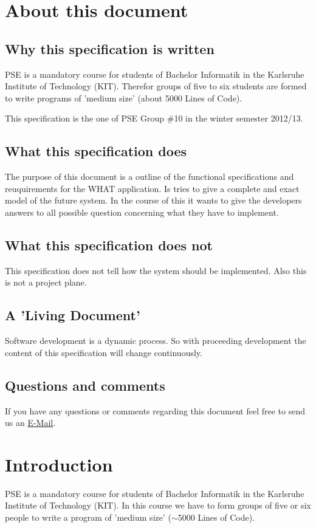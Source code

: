 \section*{About this document}

\subsection*{Why this specification is written}
PSE is a mandatory course for students of Bachelor Informatik in the %
Karlsruhe Institute of Technology (KIT). Therefor groups of five to six
students are formed to write programs of 'medium size' (about 5000 Lines of Code).

This specification is the one of PSE Group \#10 in the winter semester 2012/13.


\subsection*{What this specification does}
The purpose of this document is a outline of the functional specifications and reuquirements
for the WHAT application. Is tries to give a complete and exact model of the future system.
In the course of this it wants to give the developers answers to all possible question concerning
what they have to implement.

\subsection*{What this specification does not}
This specification does not tell how the system should be implemented.
Also this is not a project plane.


\subsection*{A 'Living Document'}
Software development is a dynamic process. So with proceeding development the content of this specification
will change continuously. 

\subsection*{Questions and comments}
If you have any questions or comments regarding this document feel free to send us an 
\href{mailto:pse10-group14-ws12@ira.uni-karlsruhe.de}{E-Mail}.

 
\newpage
\section*{Introduction} %
PSE is a mandatory course for students of Bachelor Informatik in the 
Karlsruhe Institute of Technology (KIT).
In this course we have to form groups of five or six people to write
 a program of 'medium size' ($\sim$5000 Lines of Code).

